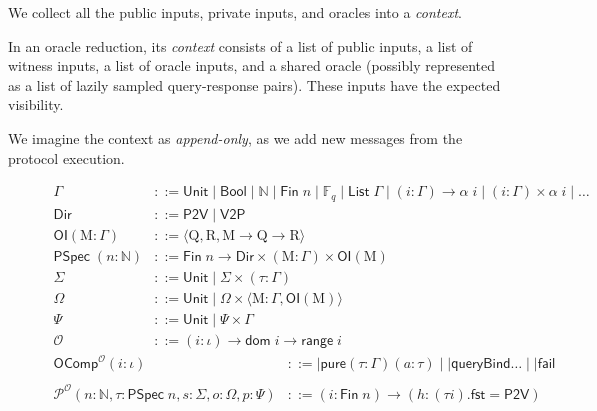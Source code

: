 We collect all the public inputs, private inputs, and oracles into a \emph{context}.

\begin{definition}[Context]\label{def:context}
    In an oracle reduction, its \emph{context} consists of a list of public inputs, a list of witness inputs, a list of oracle inputs, and a shared oracle (possibly represented as a list of lazily sampled query-response pairs). These inputs have the expected visibility.
\end{definition}

We imagine the context as \emph{append-only}, as we add new messages from the protocol execution.

\begin{figure}[t]
    \begin{align}
        \Gamma &::= \mathsf{Unit} \mid \mathsf{Bool} \mid \mathbb{N} \mid \mathsf{Fin}\; n \mid \mathbb{F}_q \mid \mathsf{List}\;\Gamma \mid (i : \Gamma) \to \alpha\; i \mid (i : \Gamma) \times \alpha\; i \mid \dots \\[1em]
        \mathsf{Dir} &::= \mathsf{P2V} \mid \mathsf{V2P} \\ 
        \mathsf{OI} (\mathrm{M} : \Gamma) &::= \langle \mathrm{Q}, \mathrm{R}, \mathrm{M} \to \mathrm{Q} \to \mathrm{R} \rangle \\
        \mathsf{PSpec}\; (n : \mathbb{N}) &::= \mathsf{Fin}\; n \to \mathsf{Dir} \times (\mathrm{M} : \Gamma) \times \mathsf{OI}(\mathrm{M}) \\[1em]
        \varSigma &::= \mathsf{Unit} \mid \varSigma \times (\tau : \Gamma) \\
        \Omega &::= \mathsf{Unit} \mid \Omega \times \langle \mathrm{M} : \Gamma, \mathsf{OI}(\mathrm{M}) \rangle \\
        \Psi &::= \mathsf{Unit} \mid \Psi \times \Gamma\\
        \mathcal{O} &::= (i : \iota) \to \mathsf{dom}\; i \to \mathsf{range}\; i
    \end{align}
    \begin{align}
        \mathsf{OComp}^{\mathcal{O}} (i : \iota) &::= \big| \mathsf{pure} (\tau : \Gamma) (a : \tau) \mid \big| \mathsf{queryBind} \dots \mid \big| \mathsf{fail} \\
        \\
        \mathcal{P}^{\mathcal{O}} (n : \mathbb{N}, \tau : \mathsf{PSpec}\; n, s : \varSigma, o : \Omega, p : \Psi) &::= (i : \mathsf{Fin}\; n) \to (h : (\tau i).\mathsf{fst} = \mathsf{P2V}) \\

\end{align}
\end{figure}
